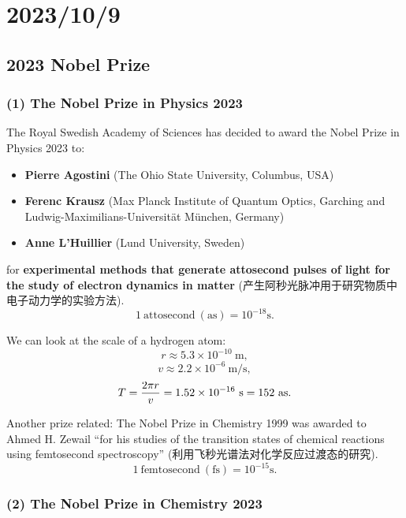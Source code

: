 \chapter{2023/10/9}\label{20231009}

\section{2023 Nobel Prize}\label{nobel-prize}

\subsection*{(1) The Nobel Prize in Physics
2023}\label{the-nobel-prize-in-physics-2023}

The Royal Swedish Academy of Sciences has decided to award the Nobel
Prize in Physics 2023 to:

\begin{itemize}
\tightlist{}
\item
  \textbf{Pierre Agostini} (The Ohio State University, Columbus, USA)
\item
  \textbf{Ferenc Krausz} (Max Planck Institute of Quantum Optics,
  Garching and Ludwig-Maximilians-Universität München, Germany)
\item
  \textbf{Anne L'Huillier} (Lund University, Sweden)
\end{itemize}

for \textbf{experimental methods that generate attosecond pulses of
light for the study of electron dynamics in matter}
(产生阿秒光脉冲用于研究物质中电子动力学的实验方法).
\[1 \ \mathrm{attosecond \ (as)} = 10^{-18} \mathrm{s}.\]

We can look at the scale of a hydrogen atom:
\[r \approx 5.3 \times 10^{-10} \ \mathrm{m},\]
\[v \approx 2.2 \times 10^{-6} \ \mathrm{m/s},\]
\[T = {2 \pi r \over v} = 1.52 \times 10^{-16} \ \mathrm{s} = 152 \ \mathrm{as}.\]

Another prize related: The Nobel Prize in Chemistry 1999 was awarded to
Ahmed H. Zewail ``for his studies of the transition states of chemical
reactions using femtosecond spectroscopy''
(利用飞秒光谱法对化学反应过渡态的研究).
\[1 \ \mathrm{femtosecond \ (fs)} = 10^{-15} \mathrm{s}.\]

\subsection*{(2) The Nobel Prize in Chemistry
2023}\label{the-nobel-prize-in-chemistry-2023}

